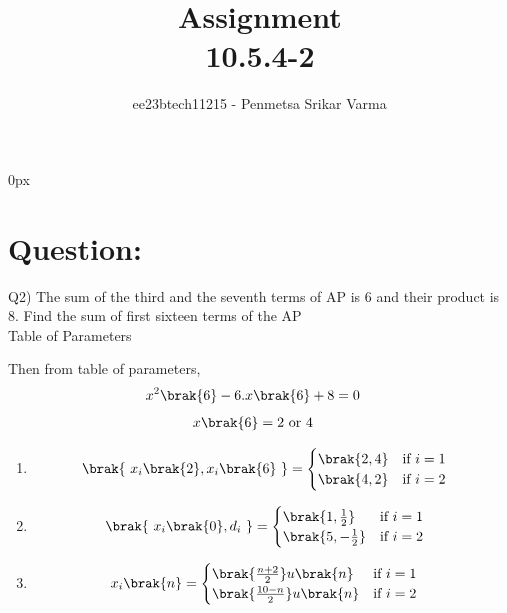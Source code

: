 \documentclass[journal,12pt,twocolumn]{IEEEtran}
\theoremstyle{remark}
\begin{document}
\parindent 0px


\title{Assignment\\[1ex]10.5.4-2}
\author{ee23btech11215 - Penmetsa Srikar Varma$^{}$%
}
\maketitle
\newpage
\bigskip

\renewcommand{\thefigure}{\theenumi}
\renewcommand{\thetable}{\theenumi}
\section*{Question:}
Q2) The sum of the third and the seventh terms of AP is 6 and their product is 8. Find the sum of first sixteen terms of the AP\\
\fi
{
\centering
Table of Parameters\\
}
\begin{table}[h]
    \centering
    
    \label{table of parameters}
\end{table}
Then from table of parameters,
\begin{align}
x^2\brak{6}-6.x\brak{6}+8&=0
\end{align}
\begin{align}
x\brak{6}&=2\ \text{or}\ 4
\end{align}
\begin{enumerate}
 \item \begin{align}
    \brak{\ x_i\brak{2},x_i\brak{6}\ } &=
    \begin{cases}
        \brak{2,4} & \text{if } i = 1 \\
        \brak{4,2} & \text{if } i = 2 
    \end{cases}
\end{align}
\item \begin{align}
    \brak{\ x_i\brak{0},d_i\ }&=
    \begin{cases}
         \brak{1,\frac{1}{2}}& \text{if } i=1 \\
         \brak{5,-\frac{1}{2}} & \text{if } i=2
    \end{cases}
\end{align}
\item \begin{align}
    x_i\brak{n} &=
    \begin{cases}
        \brak{\frac{n+2}{2}}u\brak{n} & \text{if } i=1 \\
        \brak{\frac{10-n}{2}}u\brak{n} & \text{if } i=2 
    \end{cases}
\end{align}\\
\end{enumerate}
\end{document}
